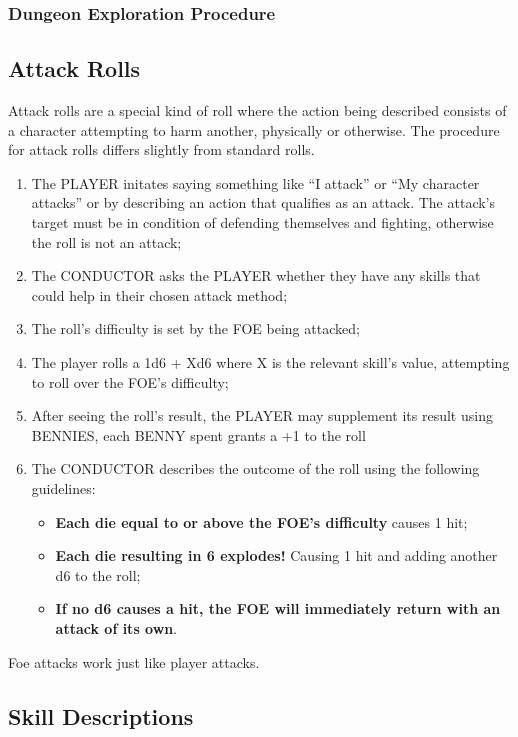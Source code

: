 \subsubsection{Dungeon Exploration Procedure}

\subsection{Attack Rolls}
Attack rolls are a special kind of roll where the action being described consists of a character attempting to harm another, physically or otherwise. The procedure for attack rolls differs slightly from standard rolls.
\begin{enumerate}
    \item {The PLAYER initates saying something like ``I attack'' or ``My character attacks'' or by describing an action that qualifies as an attack. The attack's target must be in condition of defending themselves and fighting, otherwise the roll is not an attack;}
    \item {The CONDUCTOR asks the PLAYER whether they have any skills that could help in their chosen attack method;}
    \item {The roll's difficulty is set by the FOE being attacked;}
    \item {The player rolls a 1d6 + Xd6 where X is the relevant skill's value, attempting to roll over the FOE's difficulty;}
    \item {After seeing the roll's result, the PLAYER may supplement its result using BENNIES, each BENNY spent grants a +1 to the roll}
    \item {The CONDUCTOR describes the outcome of the roll using the following guidelines:}
    \begin{itemize}
        \item {\textbf{Each die equal to or above the FOE's difficulty} causes 1 hit;}
        \item {\textbf{Each die resulting in 6 explodes!} Causing 1 hit and adding another d6 to the roll;}
        \item {\textbf{If no d6 causes a hit, the FOE will immediately return with an attack of its own}.}
    \end{itemize}
\end{enumerate}
Foe attacks work just like player attacks.

\subsection{Skill Descriptions}
